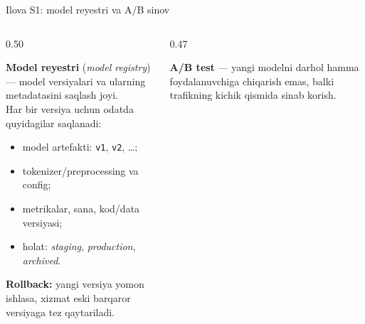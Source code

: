 \documentclass[aspectratio=169,11pt]{beamer}
\newcommand{\uzq}{\textquotesingle{}}   %
\begin{document}
\begin{frame}{Ilova S1: model reyestri va A/B sinov}
  \small
\vspace{-4mm}
  \begin{columns}[T,totalwidth=\textwidth]
    \begin{column}{0.50\textwidth}
      \begin{tcolorbox}[defbox,title={Model reyestri},top=2pt,bottom=2pt]
        \footnotesize
        \textbf{Model reyestri} (\textit{model registry}) ---
        model versiyalari va ularning metadatasini saqlash joyi.\\[3pt]

        Har bir versiya uchun odatda quyidagilar saqlanadi:
        \begin{itemize}\setlength\itemsep{1pt}
          \item model artefakti: \texttt{v1}, \texttt{v2}, \dots;
          \item tokenizer/preprocessing va config;
          \item metrikalar, sana, kod/data versiyasi;
          \item holat: \textit{staging}, \textit{production}, \textit{archived}.
        \end{itemize}
      \end{tcolorbox}

      \vspace{3pt}

      \begin{tcolorbox}[okbox,top=2pt,bottom=2pt]
        \footnotesize
        \textbf{Rollback:}
        yangi versiya yomon ishlasa, xizmat eski barqaror versiyaga tez
        qaytariladi.
      \end{tcolorbox}
    \end{column}

    \begin{column}{0.47\textwidth}
      \begin{tcolorbox}[warnbox,title={A/B sinov},top=2pt,bottom=2pt]
        \footnotesize
        \textbf{A/B test} --- yangi modelni darhol hamma foydalanuvchiga
        chiqarish emas, balki trafikning kichik qismida sinab ko\uzq{}rish.
      \end{tcolorbox}

      \vspace{3pt}


\end{column}
\end{columns}
\end{frame}
\end{document}
